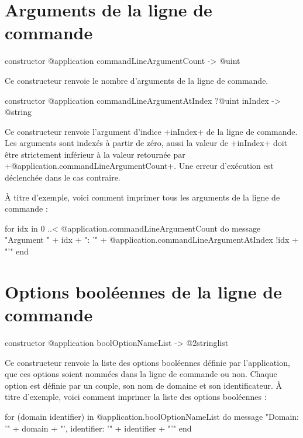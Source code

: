 \section{Arguments de la ligne de commande}



\begin{galgasbox}
constructor @application commandLineArgumentCount -> @uint
\end{galgasbox}

Ce constructeur renvoie le nombre d'arguments de la ligne de commande.



\begin{galgasbox}
constructor @application commandLineArgumentAtIndex ?@uint inIndex -> @string
\end{galgasbox}

Ce constructeur renvoie l'argument d'indice \ggs+inIndex+ de la ligne de commande. Les arguments sont indexés à partir de zéro, aussi la valeur de \ggs+inIndex+ doit être strictement inférieur à la valeur retournée par \ggs+@application.commandLineArgumentCount+. Une erreur d'exécution est déclenchée dans le cas contraire.

À titre d'exemple, voici comment imprimer tous les arguments de la ligne de commande :
\begin{galgas}
for idx in 0 ..< @application.commandLineArgumentCount do
  message "Argument " + idx + ": '"
    + @application.commandLineArgumentAtIndex {!idx} + "'\n"
end
\end{galgas}










\section{Options booléennes de la ligne de commande}


\begin{galgasbox}
constructor @application boolOptionNameList -> @2stringlist
\end{galgasbox}

Ce constructeur renvoie la liste des options booléennes définie par l'application, que ces options soient nommées dans la ligne de commande ou non. Chaque option est définie par un couple, son nom de domaine et son identificateur. À titre d'exemple, voici comment imprimer la liste des options booléennes :
\begin{galgas}
for (domain identifier) in @application.boolOptionNameList do
  message "Domain: '" + domain + "', identifier: '" + identifier + "'\n"
end
\end{galgas}


